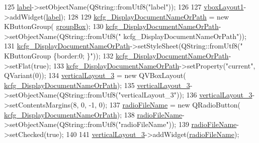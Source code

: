 \begin{DoxyCode}
125         \hyperlink{classUi__DlgGeneralBase_a6580c8bff94e006f767780163d3ca0da}{label}->setObjectName(QString::fromUtf8(\textcolor{stringliteral}{"label"}));
126 
127         \hyperlink{classUi__DlgGeneralBase_ada5c5c425bafcc272b9562c93ed886e8}{vboxLayout1}->addWidget(\hyperlink{classUi__DlgGeneralBase_a6580c8bff94e006f767780163d3ca0da}{label});
128 
129         \hyperlink{classUi__DlgGeneralBase_a1e6d624833130b412bc2bea8a1861025}{kcfg\_DisplayDocumentNameOrPath} = \textcolor{keyword}{new} KButtonGroup(
      \hyperlink{classUi__DlgGeneralBase_aa25408255cc1bc3b6d720b58ceb42e32}{groupBox});
130         \hyperlink{classUi__DlgGeneralBase_a1e6d624833130b412bc2bea8a1861025}{kcfg\_DisplayDocumentNameOrPath}->setObjectName(QString::fromUtf8(\textcolor{stringliteral}{"
      kcfg\_DisplayDocumentNameOrPath"}));
131         \hyperlink{classUi__DlgGeneralBase_a1e6d624833130b412bc2bea8a1861025}{kcfg\_DisplayDocumentNameOrPath}->setStyleSheet(QString::fromUtf8(\textcolor{stringliteral}{"
      KButtonGroup \{border:0; \}"}));
132         \hyperlink{classUi__DlgGeneralBase_a1e6d624833130b412bc2bea8a1861025}{kcfg\_DisplayDocumentNameOrPath}->setFlat(\textcolor{keyword}{true});
133         \hyperlink{classUi__DlgGeneralBase_a1e6d624833130b412bc2bea8a1861025}{kcfg\_DisplayDocumentNameOrPath}->setProperty(\textcolor{stringliteral}{"current"}, QVariant(0));
134         \hyperlink{classUi__DlgGeneralBase_a3f67713f653ddd26bc82cb90b4836bd4}{verticalLayout\_3} = \textcolor{keyword}{new} QVBoxLayout(
      \hyperlink{classUi__DlgGeneralBase_a1e6d624833130b412bc2bea8a1861025}{kcfg\_DisplayDocumentNameOrPath});
135         \hyperlink{classUi__DlgGeneralBase_a3f67713f653ddd26bc82cb90b4836bd4}{verticalLayout\_3}->setObjectName(QString::fromUtf8(\textcolor{stringliteral}{"verticalLayout\_3"}));
136         \hyperlink{classUi__DlgGeneralBase_a3f67713f653ddd26bc82cb90b4836bd4}{verticalLayout\_3}->setContentsMargins(8, 0, -1, 0);
137         \hyperlink{classUi__DlgGeneralBase_a40cff822b48d52cb4524aa842477519a}{radioFileName} = \textcolor{keyword}{new} QRadioButton(
      \hyperlink{classUi__DlgGeneralBase_a1e6d624833130b412bc2bea8a1861025}{kcfg\_DisplayDocumentNameOrPath});
138         \hyperlink{classUi__DlgGeneralBase_a40cff822b48d52cb4524aa842477519a}{radioFileName}->setObjectName(QString::fromUtf8(\textcolor{stringliteral}{"radioFileName"}));
139         \hyperlink{classUi__DlgGeneralBase_a40cff822b48d52cb4524aa842477519a}{radioFileName}->setChecked(\textcolor{keyword}{true});
140 
141         \hyperlink{classUi__DlgGeneralBase_a3f67713f653ddd26bc82cb90b4836bd4}{verticalLayout\_3}->addWidget(\hyperlink{classUi__DlgGeneralBase_a40cff822b48d52cb4524aa842477519a}{radioFileName});

\end{DoxyCode}

